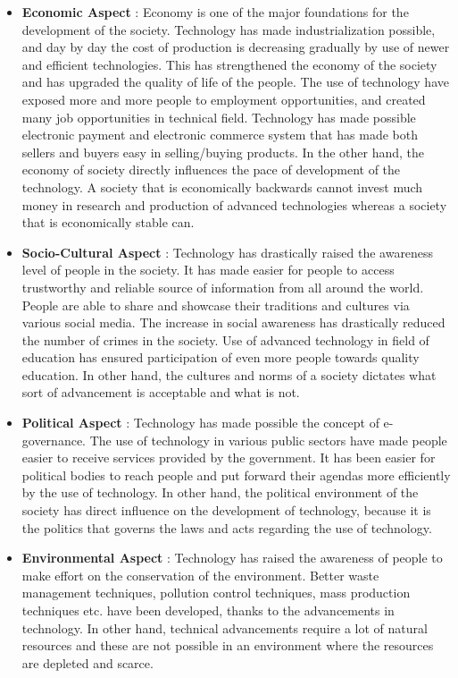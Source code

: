 \documentclass [12pt, a4paper]{article}
\begin{document}
\begin{itemize}
\item \textbf{Economic Aspect} : Economy is one of the major foundations for the development of the society. Technology has made industrialization possible, and day by day the cost of production is decreasing gradually by use of newer and efficient technologies. This has strengthened the economy of the society and has upgraded the quality of life of the people. The use of technology have exposed more and more people to employment opportunities, and created many job opportunities in technical field. Technology has made possible electronic payment and electronic commerce system that has made both sellers and buyers easy in selling/buying products. In the other hand, the economy of society directly influences the pace of development of the technology. A society that is economically backwards cannot invest much money in research and production of advanced technologies whereas a society that is economically stable can.

\item \textbf{Socio-Cultural Aspect}  : Technology has drastically raised the awareness level of people in the society. It has made easier for people to access trustworthy and reliable source of information from all around the world. People are able to share and showcase their traditions and cultures via various social media. The increase in social awareness has drastically reduced the number of crimes in the society. Use of advanced technology in field of education has ensured participation of even more people towards quality education. In other hand, the cultures and norms of a society dictates what sort of advancement is acceptable and what is not.


\item \textbf{Political Aspect} : Technology has made possible the concept of e-governance. The use of technology in various public sectors have made people easier to receive services provided by the government. It has been easier for political bodies to reach people and put forward their agendas more efficiently by the use of technology. In other hand, the political environment of the society has direct influence on the development of technology, because it is the politics that governs the laws and acts regarding the use of technology.

\item \textbf{Environmental Aspect} : Technology has raised the awareness of people to make effort on the conservation of the environment. Better waste management techniques, pollution control techniques, mass production techniques etc. have been developed, thanks to the advancements in technology. In other hand, technical advancements require a lot of natural resources and these are not possible in an environment where the resources are depleted and scarce.\\

\end{itemize}
\end{document}
